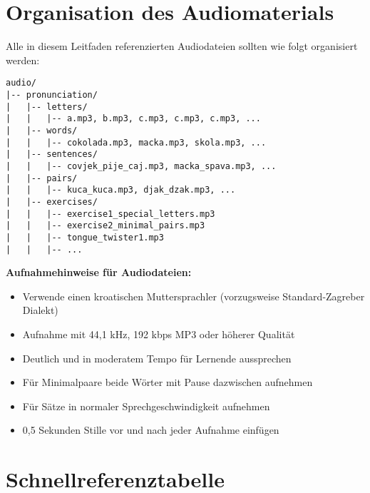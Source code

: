 \section{Organisation des Audiomaterials}

Alle in diesem Leitfaden referenzierten Audiodateien sollten wie folgt organisiert werden:

\begin{verbatim}
audio/
|-- pronunciation/
|   |-- letters/
|   |   |-- a.mp3, b.mp3, c.mp3, c.mp3, c.mp3, ...
|   |-- words/
|   |   |-- cokolada.mp3, macka.mp3, skola.mp3, ...
|   |-- sentences/
|   |   |-- covjek_pije_caj.mp3, macka_spava.mp3, ...
|   |-- pairs/
|   |   |-- kuca_kuca.mp3, djak_dzak.mp3, ...
|   |-- exercises/
|   |   |-- exercise1_special_letters.mp3
|   |   |-- exercise2_minimal_pairs.mp3
|   |   |-- tongue_twister1.mp3
|   |   |-- ...
\end{verbatim}

\textbf{Aufnahmehinweise für Audiodateien:}
\begin{itemize}
    \item Verwende einen kroatischen Muttersprachler (vorzugsweise Standard-Zagreber Dialekt)
    \item Aufnahme mit 44,1 kHz, 192 kbps MP3 oder höherer Qualität
    \item Deutlich und in moderatem Tempo für Lernende aussprechen
    \item Für Minimalpaare beide Wörter mit Pause dazwischen aufnehmen
    \item Für Sätze in normaler Sprechgeschwindigkeit aufnehmen
    \item 0,5 Sekunden Stille vor und nach jeder Aufnahme einfügen
\end{itemize}

\section{Schnellreferenztabelle}

